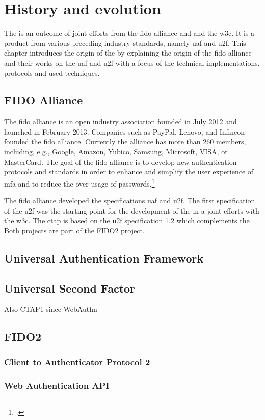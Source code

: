 
\section{History and evolution}

The \wa{} is an outcome of joint efforts from the \gls{fido} alliance and and the \gls{w3c}. It is a product from various preceding industry standards, namely \gls{uaf} and \gls{u2f}. This chapter introduces the origin of the \wa{} by explaining the origin of the \gls{fido} alliance and their works on the \gls{uaf} and \gls{u2f} with a focus of the technical implementations, protocols and used techniques.

\subsection{FIDO Alliance}

The \gls{fido} alliance is an open industry association founded in July 2012 and launched in February 2013. Companies such as PayPal, Lenovo, and Infineon founded the \gls{fido} alliance. Currently the alliance has more than 260 members, including, e.g., Google, Amazon, Yubico, Samsung, Microsoft, VISA, or MasterCard. The goal of the \gls{fido} alliance is to develop new authentication protocols and standards in order to enhance and simplify the user experience of \gls{mfa} and to reduce the over usage of passwords.\footcites[See][583]{eckert-it-sec-9}

The \gls{fido} alliance developed the specifications \gls{uaf} and \gls{u2f}. The first specification of the \gls{u2f} was the starting point for the development of the \wa{} in a joint efforts with the \gls{w3c}. The \gls{ctap} is based on the \gls{u2f} specification 1.2 which complements the \wa. Both projects are part of the FIDO2 project.

\subsection{Universal Authentication Framework}

\subsection{Universal Second Factor}

Also CTAP1 since WebAuthn

\subsection{FIDO2}

\subsubsection{Client to Authenticator Protocol 2}

\subsubsection{Web Authentication API}